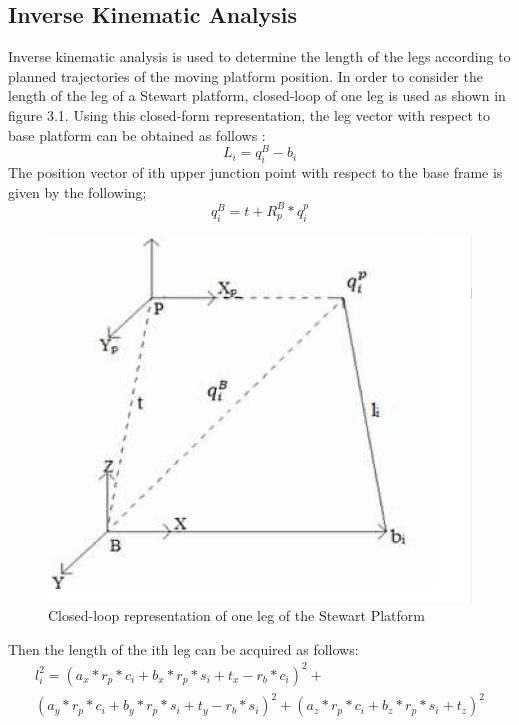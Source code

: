 \subsection{Inverse Kinematic Analysis}
Inverse kinematic analysis is used to determine the length of the legs according to planned trajectories of the moving platform position. In order to consider the length of the leg of a Stewart platform, closed-loop of one leg is used as shown in figure 3.1. Using this closed-form representation, the leg
vector with respect to base platform can be obtained as follows \cite{csumnu2017simulation}:
\begin{equation}
\label{eqn}
L_{i} = q_{i}^{B} - b_{i}
\end{equation}
The position vector of ith upper junction point with respect to the base frame is given by the following;
\begin{equation}
\label{eqn}
q_{i}^{B} = t + R_{p}^{B} * q_{i}^{p}
\end{equation}
\begin{center}
	\begin{figure}[!h]
	\centering
	\includegraphics[width=0.6\linewidth]{Figures/Fig12}
	\caption[Closed-loop representation]{Closed-loop representation of one leg of the Stewart Platform \cite{csumnu2017simulation}}
	\end{figure}
\end{center}
Then the length of the ith leg can be acquired as follows:
\newpage
\begin{multline}
\label{eqn}
l_{i}^2 = (a_{x} * r_{p} * c_{i} + b_{x}*r_{p}*s_{i}
+ t_{x}-r_{b}*c_{i})^2 + \\(a_{y}*r_{p}*c_{i} + b_{y}*r_{p}*s_{i} + t_{y}-r_{b}*s_{i})^2+ (a_{z}*r_{p}*c_{i}+b_{z}*r_{p}*s_{i}+t_{z})^2
\end{multline}


